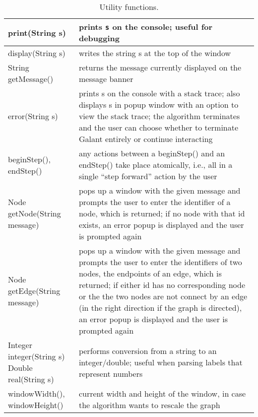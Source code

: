 \begin{table}
  \small
  \centering
  \begin{tabular}{| m{} | m{} |}
    \hline
    \textsf{print(String s)}
    &
    prints \texttt{s} on the console; useful for debugging
    \\ \hline
    \textsf{display(String s)}
    &
    writes the string \textsf{s} at the top of the window
    \\ \hline
    \textsf{String getMessage()}
    &
    returns the message currently displayed on the message banner
    \\ \hline
    \textsf{error(String s)}
    &
    prints \textsf{s} on the console with a stack trace; also displays
    \textsf{s} in popup window with an option to view the stack trace;
    the algorithm terminates and the user can choose whether to terminate
    Galant entirely or continue interacting
    \\ \hline
    \textsf{beginStep()},
    \textsf{endStep()}
    &
    any actions between a \textsf{beginStep()} and an \textsf{endStep()}
    take place atomically, i.e.,
    all in a single ``step forward'' action by the user
    \\ \hline
    \textsf{Node getNode(String message)}
    &
    pops up a window with the given message and prompts the user to enter the
    identifier of a node, which is returned;
    if no node with that id exists,
    an error popup is displayed and the user is prompted again
    \\ \hline
    \textsf{Node getEdge(String message)}
    &
    pops up a window with the given message and prompts the user to enter the
    identifiers of two nodes, the endpoints of an edge, which is returned;
    if either id has no corresponding node or the the two nodes are not connect
    by an edge (in the right direction if the graph is directed),
    an error popup is displayed and the user is prompted again
    \\ \hline
    \shortstack[l] {
      \textsf{Integer integer(String s)}\\
      \textsf{Double real(String s)}
    }
    &
    performs conversion from a string to an integer/double; useful when parsing
    labels that represent numbers
    \\ \hline
    \textsf{windowWidth()}, \textsf{windowHeight()}
    &
    current width and height of the window, in case the algorithm wants to rescale
    the graph
    \\ \hline
  \end{tabular}
  \caption{Utility functions.}
  \label{tab:utility_functions}
\end{table}


